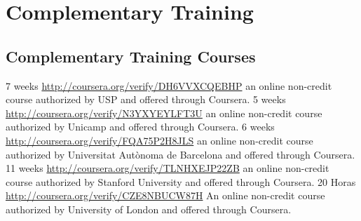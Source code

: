 \documentclass[11pt,a4paper,sans]{moderncv} %
\begin{document}
\section{Complementary Training}

\subsection{Complementary Training Courses}
	      {7 weeks}
	      {\url{http://coursera.org/verify/DH6VVXCQEBHP}}{}
	      {an online non-credit course authorized by USP and offered through Coursera.}
	      {5 weeks}
	      {\url{http://coursera.org/verify/N3YXYEYLFT3U}}{}
	      {an online non-credit course authorized by Unicamp and offered through Coursera.}
	      {6 weeks}
	      {\url{http://coursera.org/verify/FQA75P2H8JLS}}{}
	      {an online non-credit course authorized by Universitat Autònoma de Barcelona and offered through Coursera.}
	      {11 weeks}
	      {\url{http://coursera.org/verify/TLNHXEJP22ZB}}{}
	      {an online non-credit course authorized by Stanford University and offered through Coursera.}
	      {20 Horas}
	      {\url{http://coursera.org/verify/CZE8NBUCW87H}}{}
	      {An online non-credit course authorized by University of London and offered through Coursera.}





\end{document}
